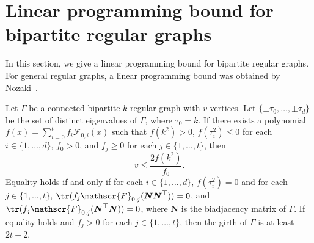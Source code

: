 \section{Linear programming bound for bipartite regular graphs} 
\label{sec:lp}

In this section, we give a linear programming bound for bipartite regular graphs. For general regular graphs, a linear programming bound was obtained by Nozaki~\cite{N}. %
\begin{theo}
\label{thm:lp_bound}
Let $\Gamma$ be a connected bipartite $k$-regular graph with $v$ vertices. 
Let $\{\pm \tau_0, \ldots, \pm \tau_d \}$ be the set of distinct eigenvalues of $\Gamma$, 
where $\tau_0=k$. 
If there exists a polynomial $f(x)=\sum_{i= 0}^t f_i \mathscr{F}_{0,i}(x)$ such that 
$f(k^2)>0$, $f(\tau_i^2) \leq 0$ for each $i\in \{1,\ldots, d \}$, $f_0>0$, and $f_j \geq 0$ for each $j \in \{1,\ldots, t \}$, then 
\begin{equation} 
\label{eq:lp} 
v \leq \frac{2 f(k^2)}{f_0}. 
\end{equation}
Equality holds if and only if for each $i \in \{1,\ldots, d\}$, $f(\tau_i^2)=0$ and for each $j\in \{1,\dots,t\}$, $\tr (f_j\mathscr{F}_{0,j}(\boldsymbol{N}\boldsymbol{N}^{\top}))=0$, 
and $\tr (f_j\mathscr{F}_{0,j}(\boldsymbol{N}^{\top} \boldsymbol{N}))=0$, 
where $\boldsymbol{N}$ is the biadjacency matrix of $\Gamma$.
If equality holds and $f_j>0$ for each $j \in \{1,\ldots, t\}$, then the girth of $\Gamma$ is at least 
$2t+2$. 
\end{theo}
